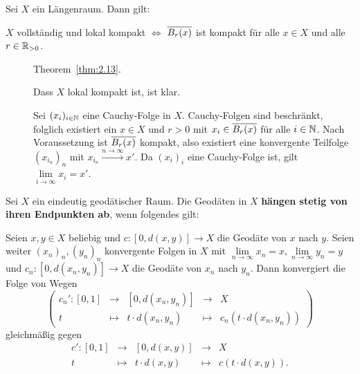 \begin{korollar}
\label{kor:2.16}
	Sei $X$ ein Längenraum.
	Dann gilt:
	\begin{center}
		$X$ vollständig und lokal kompakt \quad $\Leftrightarrow$ \quad $\overline{B_r(x)}$ ist kompakt für alle $x \in X$ und alle $r \in \mathbb{R}_{>0}$.
	\end{center}
\end{korollar}

\begin{beweis}
	\begin{description}
		\item[\bewhin] Theorem~\ref{thm:2.13}.
		\item[\bewrueck] Dass $X$ lokal kompakt ist, ist klar.
		
		Sei $(x_i)_{i \in \mathbb{N}}$ eine Cauchy-Folge in $X$.
		Cauchy-Folgen sind beschränkt, folglich existiert ein $x \in X$ und $r > 0$ mit $x_i \in \overline{B_r(x)}$ für alle $i \in \mathbb{N}$.
		Nach Voraussetzung ist $\overline{B_r(x)}$ kompakt, also existiert eine konvergente Teilfolge $(x_{i_n})_n$ mit $x_{i_n} \xrightarrow{n \rightarrow \infty} x'$.
		Da $(x_i)_i$ eine Cauchy-Folge ist, gilt $\lim\limits_{i \rightarrow \infty} x_i = x'$. 
	\end{description}
\end{beweis}

\begin{definition}
\label{def:2.17}
	Sei $X$ ein eindeutig geodätischer Raum. 
	Die Geodäten in $X$ \textbf{hängen stetig von ihren Endpunkten ab}, wenn folgendes gilt:
	
	Seien $x,y \in X$ beliebig und $c\colon [0,d(x,y)] \rightarrow X$ die Geodäte von $x$ nach $y$.
	Seien weiter $(x_n)_n, (y_n)_n$ konvergente Folgen in $X$ mit $\lim\limits_{n \rightarrow \infty} x_n = x, \lim\limits_{n \rightarrow \infty} y_n = y$ und $c_n \colon [0,d(x_n,y_n)] \rightarrow X$ die Geodäte von $x_n$ nach $y_n$.
	Dann konvergiert die Folge von Wegen
	\[
		\left( \begin{array}{rcccl}
			c_n'\colon [0,1] & \longrightarrow & [0,d(x_n,y_n)] & \longrightarrow & X \\
			t & \longmapsto & t \cdot d(x_n,y_n) & \longmapsto & c_n(t \cdot d(x_n,y_n))
		\end{array} \right)
	\]
	gleichmäßig gegen
	\[
		\begin{array}{rcccl}
			c'\colon [0,1] & \longrightarrow & [0,d(x,y)] & \longrightarrow & X \\
			t & \longmapsto & t \cdot d(x,y) & \longmapsto & c(t \cdot d(x,y)).
		\end{array}
	\]	
\end{definition}

